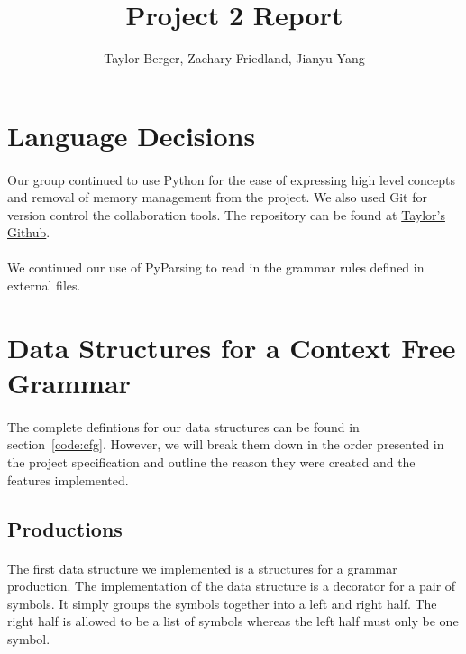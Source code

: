 \documentclass{article}
\begin{document}
\title{Project 2 Report}
\author{Taylor Berger, Zachary Friedland, Jianyu Yang}
\maketitle

\section{Language Decisions}
\paragraph{} Our group continued to use Python for the
ease of expressing high level concepts and removal of memory
management from the project. We also used Git for version control the
collaboration tools. The repository can be found at
\href{https://www.github.com/teberger/cs554-project2}{Taylor's Github}.

\paragraph{} We continued our use of PyParsing to read in the grammar 
rules defined in external files. 

\section{Data Structures for a Context Free Grammar}
\paragraph{}The complete defintions for our data structures can be 
found in section~\ref{code:cfg}. However, we will break them down in
the order presented in the project specification and outline the
reason they were created and the features implemented.

\subsection{Productions}
\paragraph{} The first data structure we implemented is a structures
for a grammar production. The implementation of the data structure is a
decorator for a pair of symbols. It simply groups the symbols together
into a left and right half. The right half is allowed to be a list 
of symbols whereas the left half must only be one symbol.
\end{document}
